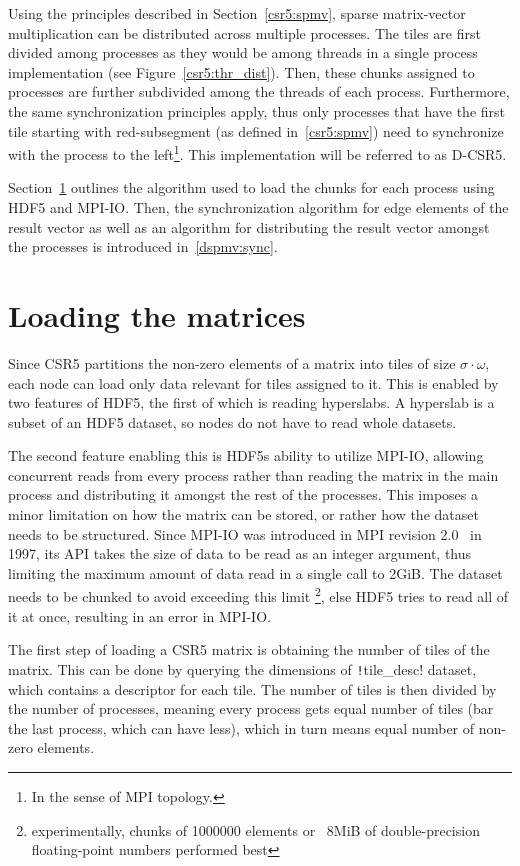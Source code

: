 \documentclass[thesis=M,english]{FITthesis}[2019/12/23]
\newcommand{\csre}[1]{\texttt!#1!}
\begin{document}
Using the principles described in Section~\ref{csr5:spmv}, sparse matrix-vector multiplication can be
distributed across multiple processes. The tiles are first divided among processes as they would be
among threads in a single process implementation (see Figure~\ref{csr5:thr_dist}). Then, these chunks
assigned to processes are further subdivided among the threads of each process. Furthermore, the same
synchronization principles apply, thus only processes that have the first tile starting with red-subsegment
(as defined in~\ref{csr5:spmv}) need to synchronize with the process to the
left\footnote{In the sense of MPI topology.}. This implementation will be referred to as D-CSR5.

Section~\ref{dspmv:load} outlines the algorithm used to load the chunks for each process using HDF5 and
MPI-IO. Then, the synchronization algorithm for edge elements of the result vector as well as an algorithm for
distributing the result vector amongst the processes is introduced in~\ref{dspmv:sync}.



\section{Loading the matrices}\label{dspmv:load}

Since CSR5 partitions the non-zero elements of a matrix into tiles of
size \(\sigma \cdot \omega\), each node can load only data relevant for tiles
assigned to it. This is enabled by two features of HDF5, the first of which
is reading hyperslabs. A hyperslab is a subset of an HDF5 dataset, so
nodes do not have to read whole datasets.

The second feature enabling this is HDF5s ability to utilize MPI-IO, allowing concurrent
reads from every process rather than reading the matrix in the main process
and distributing it amongst the rest of the processes. This imposes a minor limitation
on how the matrix can be stored, or rather how the dataset needs to be structured.
Since MPI-IO was introduced in MPI revision 2.0~\cite{mpi20} in 1997, its API takes
the size of data to be read as an integer argument, thus limiting the maximum amount of data read
in a single call to 2GiB. The dataset needs to be chunked to avoid exceeding this limit
\footnote{experimentally, chunks of 1000000 elements or ~8MiB of double-precision floating-point numbers performed best}, 
else HDF5 tries to read all of it at once, resulting in an error in MPI-IO.


The first step of loading a CSR5 matrix is obtaining the number of tiles of the matrix. This can be
done by querying the dimensions of \csre{tile_desc} dataset, which contains a descriptor for each tile.
The number of tiles is then divided by the number of processes, meaning every process gets equal
number of tiles (bar the last process, which can have less), which in turn means equal number
of non-zero elements.
\end{document}
